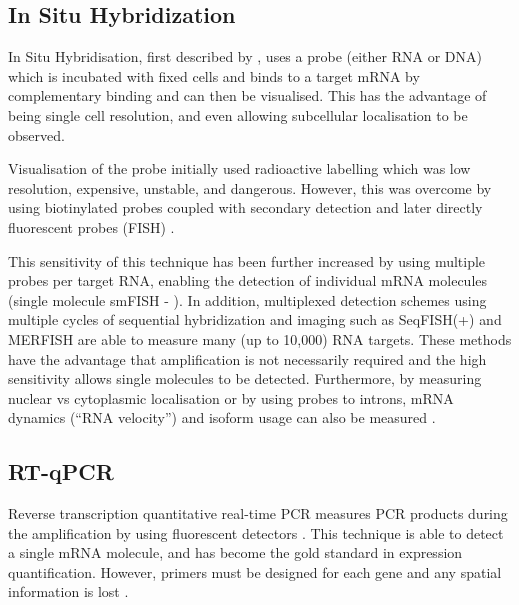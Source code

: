 \subsection{In Situ Hybridization}
In Situ Hybridisation, first described by \cite{Gall1969Formation}, uses a probe (either RNA or DNA) which is incubated with fixed cells and binds to a target mRNA by complementary binding and can then be visualised.
This has the advantage of being single cell resolution, and even allowing subcellular localisation to be observed.

Visualisation of the probe initially used radioactive labelling which was low resolution, expensive, unstable, and dangerous.
However, this was overcome by using biotinylated probes coupled with secondary detection \parencite{Singer1982Actin} and later directly fluorescent probes (FISH) \parencite{Kislauskis1993Isoformspecific}.

This sensitivity of this technique has been further increased by using multiple probes per target RNA, enabling the detection of individual mRNA molecules (single molecule smFISH - \cite{Femino1998Visualization, Raj2008Imaging}).
In addition, multiplexed detection schemes using multiple cycles of sequential hybridization and imaging such as SeqFISH(+) \parencite{Lubeck2014Singlecell,Eng2017Profiling,Eng2019Transcriptomescale} and MERFISH \parencite{Chen2015Spatially, Moffitt2016Highthroughput, Moffitt2016Highperformance, Xia2019Multiplexed} are able to measure many (up to 10,000) RNA targets.
These methods have the advantage that amplification is not necessarily required and the high sensitivity allows single molecules to be detected.
Furthermore, by measuring nuclear vs cytoplasmic localisation or by using probes to introns, mRNA dynamics (``RNA velocity'') and isoform usage can also be measured \parencite{Shah2018Dynamics, Xia2019Spatial}.


\subsection{RT-qPCR}
Reverse transcription quantitative real-time PCR measures PCR products during the amplification by using fluorescent detectors \parencite{Gibson1996novel, Heid1996Real, Chiang1996Use}.
This technique is able to detect a single mRNA molecule, and has become the gold standard in expression quantification.
However, primers must be designed for each gene and any spatial information is lost \parencite{Palmer2003New, Wong2005Realtime}.

